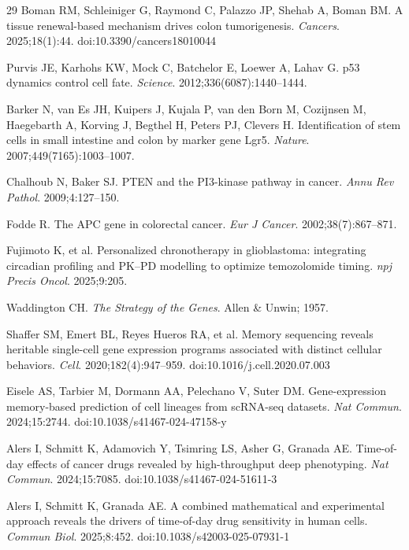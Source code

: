 \documentclass[11pt,letterpaper]{article}
\begin{document}
\begin{thebibliography}{29}
Boman RM, Schleiniger G, Raymond C, Palazzo JP, Shehab A, Boman BM. A tissue renewal-based mechanism drives colon tumorigenesis. \textit{Cancers}. 2025;18(1):44. doi:10.3390/cancers18010044

Purvis JE, Karhohs KW, Mock C, Batchelor E, Loewer A, Lahav G. p53 dynamics control cell fate. \textit{Science}. 2012;336(6087):1440--1444.

Barker N, van Es JH, Kuipers J, Kujala P, van den Born M, Cozijnsen M, Haegebarth A, Korving J, Begthel H, Peters PJ, Clevers H. Identification of stem cells in small intestine and colon by marker gene Lgr5. \textit{Nature}. 2007;449(7165):1003--1007.

Chalhoub N, Baker SJ. PTEN and the PI3-kinase pathway in cancer. \textit{Annu Rev Pathol}. 2009;4:127--150.

Fodde R. The APC gene in colorectal cancer. \textit{Eur J Cancer}. 2002;38(7):867--871.

Fujimoto K, et al. Personalized chronotherapy in glioblastoma: integrating circadian profiling and PK--PD modelling to optimize temozolomide timing. \textit{npj Precis Oncol}. 2025;9:205.

Waddington CH. \textit{The Strategy of the Genes}. Allen \& Unwin; 1957.

Shaffer SM, Emert BL, Reyes Hueros RA, et al. Memory sequencing reveals heritable single-cell gene expression programs associated with distinct cellular behaviors. \textit{Cell}. 2020;182(4):947--959. doi:10.1016/j.cell.2020.07.003

Eisele AS, Tarbier M, Dormann AA, Pelechano V, Suter DM. Gene-expression memory-based prediction of cell lineages from scRNA-seq datasets. \textit{Nat Commun}. 2024;15:2744. doi:10.1038/s41467-024-47158-y

Alers I, Schmitt K, Adamovich Y, Tsimring LS, Asher G, Granada AE. Time-of-day effects of cancer drugs revealed by high-throughput deep phenotyping. \textit{Nat Commun}. 2024;15:7085. doi:10.1038/s41467-024-51611-3

Alers I, Schmitt K, Granada AE. A combined mathematical and experimental approach reveals the drivers of time-of-day drug sensitivity in human cells. \textit{Commun Biol}. 2025;8:452. doi:10.1038/s42003-025-07931-1

\end{thebibliography}
\end{document}
